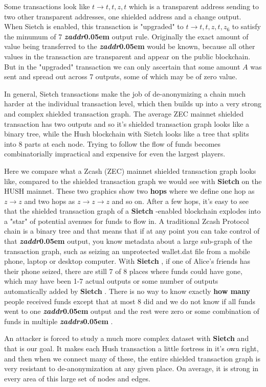 \documentclass{article}
\newcommand{\term}[1]{\textsl{#1}\kern 0.05em\xspace}
\newcommand{\zaddr}{\textbf{\term{zaddr} }}
\newcommand{\zaddrs}{\textbf{\term{zaddrs} }}
\newcommand{\Sietch}{\textbf{Sietch} }
\begin{document}
Some transactions look like $ t \rightarrow t,t,z,t $ which is a transparent address sending to
two other transparent addresses, one shielded address and a change output. When Sietch is enabled,
this transaction is "upgraded" to $ t \rightarrow t,t,z,t,z_6$ to satisfy the minumum of 7 \zaddr
output rule. Originally the exact amount of value being transferred to the \zaddr would be known,
because all other values in the transaction are transparent and appear on the public blockchain.
But in the "upgraded" transaction we can only ascertain that some amount $A$ was sent and spread
out across 7 outputs, some of which may be of zero value.

In general, Sietch transactions make the job of de-anonymizing a chain much harder at the individual
transaction level, which then builds up into a very strong and complex shielded transaction graph.
The average ZEC mainnet shielded transaction has two outputs and so it's shielded transaction graph
looks like a binary tree, while the Hush blockchain with Sietch looks like a tree that splits into
8 parts at each node. Trying to follow the flow of funds becomes combinatorially impractical and
expensive for even the largest players.

Here we compare what a Zcash (ZEC) mainnet shielded transaction graph looks like, compared to
the shielded transaction graph we would see with \Sietch on the HUSH mainnet. These two graphics
show two \textbf{hops} where we define one hop as $ z \rightarrow z $ and two hops as
$ z \rightarrow z \rightarrow z $ and so on. After a few hops, it's easy to see that the shielded
transaction graph of a \Sietch-enabled blockchain explodes into a "star" of potential avenues for
funds to flow in. A traditional Zcash Protocol chain is a binary tree and that means that if at
any point you can take control of that \zaddr output, you know metadata about a large sub-graph
of the transaction graph, such as seizing an unprotected wallet.dat file from a mobile phone,
laptop or desktop computer. With \Sietch, if one of Alice's friends has their phone seized, there
are still 7 of 8 places where funds could have gone, which may have been 1-7 actual outputs or
some number of outputs automatically added by \Sietch. There is no way to know exactly \textbf{how many}
people received funds except that at most 8 did and we do not know if all funds went to one \zaddr
output and the rest were zero or some combination of funds in multiple \zaddrs .

An attacker is forced to study a much more complex dataset with \Sietch and that is our goal. It
makes each Hush transaction a little fortress in it's own right, and then when we connect many
of these, the entire shielded transaction graph is very resistant to de-anonymization at any given
place. On average, it is strong in every area of this large set of nodes and edges.
\end{document}
